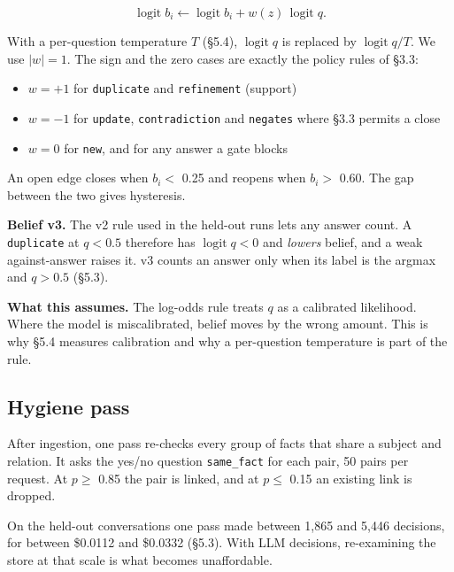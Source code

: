 \documentclass[11pt]{article}
\newcommand{\src}[1]{}
\begin{document}
\[\operatorname{logit} b_i \leftarrow \operatorname{logit} b_i + w(z)\, \operatorname{logit} q .\]

With a per-question temperature $T$ (\S{}5.4), $\operatorname{logit} q$ is replaced by $\operatorname{logit} q / T$. We use $\vert w\vert  = 1$. The sign and the zero cases are exactly the policy rules of \S{}3.3:

\begin{itemize}
\item $w = +1$ for \texttt{duplicate} and \texttt{refinement} (support)
\item $w = -1$ for \texttt{update}, \texttt{contradiction} and \texttt{negates} where \S{}3.3 permits a close
\item $w = 0$ for \texttt{new}, and for any answer a gate blocks
\end{itemize}
An open edge closes when $b_i <$ 0.25\src{src/engram/pipeline/belief.py} and reopens when $b_i >$ 0.60\src{src/engram/pipeline/belief.py}. The gap between the two gives hysteresis.

\textbf{Belief v3.} The v2 rule used in the held-out runs lets any answer count. A \texttt{duplicate} at $q < 0.5$ therefore has $\operatorname{logit} q < 0$ and \emph{lowers} belief, and a weak against-answer raises it. v3 counts an answer only when its label is the argmax and $q > 0.5$ (\S{}5.3).

\textbf{What this assumes.} The log-odds rule treats $q$ as a calibrated likelihood. Where the model is miscalibrated, belief moves by the wrong amount. This is why \S{}5.4 measures calibration and why a per-question temperature is part of the rule.

\subsection{Hygiene pass}
After ingestion, one pass re-checks every group of facts that share a subject and relation. It asks the yes/no question \texttt{same\_\allowbreak{}fact} for each pair, 50\src{src/engram/pipeline/hygiene.py} pairs per request. At $p \ge$ 0.85\src{src/engram/config.py} the pair is linked, and at $p \le$ 0.15\src{src/engram/pipeline/hygiene.py (1 − ACT_THRESHOLD)} an existing link is dropped.

On the held-out conversations one pass made between 1,865\src{bench/results/e4_belief_v2__heldout_conv-30__k3.json} and 5,446\src{bench/results/e4_belief_v2__heldout_conv-42__k3.json} decisions, for between \$0.0112\src{bench/results/e4_belief_v2__heldout_conv-30__k3.json} and \$0.0332\src{bench/results/e4_belief_v2__heldout_conv-42__k3.json} (\S{}5.3). With LLM decisions, re-examining the store at that scale is what becomes unaffordable.
\end{document}
